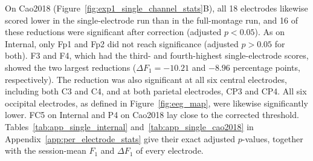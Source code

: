 On Cao2018 (Figure~\ref{fig:exp1_single_channel_stats}B), all 18 electrodes likewise scored lower in the single-electrode run than in the full-montage run, and 16 of these reductions were significant after correction (adjusted $p < 0.05$). As on Internal, only Fp1 and Fp2 did not reach significance (adjusted $p > 0.05$ for both). F3 and F4, which had the third- and fourth-highest single-electrode scores, showed the two largest reductions ($\Delta F_1 = -10.21$ and $-8.96$ percentage points, respectively). The reduction was also significant at all six central electrodes, including both C3 and C4, and at both parietal electrodes, CP3 and CP4. All six occipital electrodes, as defined in Figure~\ref{fig:eeg_map}, were likewise significantly lower. FC5 on Internal and P4 on Cao2018 lay close to the corrected threshold. Tables~\ref{tab:app_single_internal} and~\ref{tab:app_single_cao2018} in Appendix~\ref{app:per_electrode_stats} give their exact adjusted $p$-values, together with the session-mean $F_1$ and $\Delta F_1$ of every electrode.
